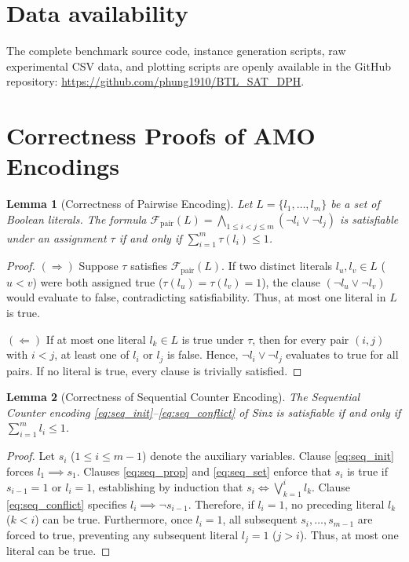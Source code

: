 \documentclass[a4paper,fleqn]{cas-sc}
\newtheorem{lemma}{Lemma}
\begin{document}
\section*{Data availability}
The complete benchmark source code, instance generation scripts, raw experimental CSV data, and plotting scripts are openly available in the GitHub repository: \url{https://github.com/phung1910/BTL_SAT_DPH}.




\appendix
\section{Correctness Proofs of AMO Encodings}
\label{sec:appendix_proofs}

\begin{lemma}[Correctness of Pairwise Encoding]
Let $L = \{l_1, \dots, l_m\}$ be a set of Boolean literals. The formula $\mathcal{F}_{\text{pair}}(L) = \bigwedge_{1 \le i < j \le m} (\neg l_i \lor \neg l_j)$ is satisfiable under an assignment $\tau$ if and only if $\sum_{i=1}^m \tau(l_i) \le 1$.
\end{lemma}
\begin{proof}
$(\Rightarrow)$ Suppose $\tau$ satisfies $\mathcal{F}_{\text{pair}}(L)$. If two distinct literals $l_u, l_v \in L$ ($u < v$) were both assigned true ($\tau(l_u) = \tau(l_v) = 1$), the clause $(\neg l_u \lor \neg l_v)$ would evaluate to false, contradicting satisfiability. Thus, at most one literal in $L$ is true.

$(\Leftarrow)$ If at most one literal $l_k \in L$ is true under $\tau$, then for every pair $(i, j)$ with $i < j$, at least one of $l_i$ or $l_j$ is false. Hence, $\neg l_i \lor \neg l_j$ evaluates to true for all pairs. If no literal is true, every clause is trivially satisfied.
\end{proof}

\begin{lemma}[Correctness of Sequential Counter Encoding]
The Sequential Counter encoding \eqref{eq:seq_init}--\eqref{eq:seq_conflict} of Sinz is satisfiable if and only if $\sum_{i=1}^m l_i \le 1$.
\end{lemma}
\begin{proof}
Let $s_i$ ($1 \le i \le m-1$) denote the auxiliary variables. Clause \eqref{eq:seq_init} forces $l_1 \implies s_1$. Clauses \eqref{eq:seq_prop} and \eqref{eq:seq_set} enforce that $s_i$ is true if $s_{i-1} = 1$ or $l_i = 1$, establishing by induction that $s_i \iff \bigvee_{k=1}^i l_k$. Clause \eqref{eq:seq_conflict} specifies $l_i \implies \neg s_{i-1}$. Therefore, if $l_i = 1$, no preceding literal $l_k$ ($k < i$) can be true. Furthermore, once $l_i = 1$, all subsequent $s_i, \dots, s_{m-1}$ are forced to true, preventing any subsequent literal $l_j = 1$ ($j > i$). Thus, at most one literal can be true.
\end{proof}
\end{document}
